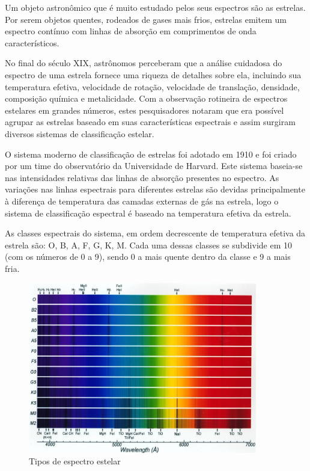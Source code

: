Um objeto astronômico que é muito estudado pelos seus espectros são as estrelas. Por serem objetos quentes, rodeados de gases mais frios, estrelas emitem um espectro contínuo com linhas de absorção em comprimentos de onda característicos.

No final do século XIX, astrônomos perceberam que a análise cuidadosa do espectro de uma estrela fornece uma riqueza de detalhes sobre ela, incluindo sua temperatura efetiva, velocidade de rotação, velocidade de translação, densidade, composição química e metalicidade. Com a observação rotineira de espectros estelares em grandes números, estes pesquisadores notaram que era possível agrupar as estrelas baseado em suas características espectrais e assim surgiram diversos sistemas de classificação estelar. 

O sistema moderno de classificação de estrelas foi adotado em 1910 e foi criado por um time do observatório da Universidade de Harvard. Este sistema baseia-se nas intensidades relativas das linhas de absorção presentes no espectro. As variações nas linhas espectrais para diferentes estrelas são devidas principalmente à diferença de temperatura das camadas externas de gás na estrela, logo o sistema de classificação espectral é baseado na temperatura efetiva da estrela. 

As classes espectrais do sistema, em ordem decrescente de temperatura efetiva da estrela são: O, B, A, F, G, K, M. Cada uma dessas classes se subdivide em 10 (com os números de 0 a 9), sendo 0 a mais quente dentro da classe e 9 a mais fria.

\begin{figure}[htb]
\centering
\includegraphics[width=10cm]{figuras/Spectra_Briley.jpg}
\caption{Tipos de espectro estelar \citep{astroprinceton}}
\label{fig:stellar-spectrum-types}
\end{figure}

